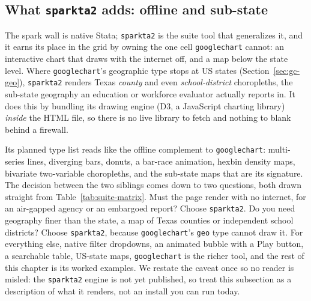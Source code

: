 \documentclass[
    a4paper,
    fontsize=10pt,
    twoside=true,
    numbers=noenddot,
]{kaobook}
\begin{document}
\subsection{What \texttt{sparkta2} adds: offline and sub-state}\label{sec:sparkta2}
The spark wall is native Stata; \texttt{sparkta2} is the suite tool that generalizes it, and it earns its place in the grid by owning the one cell \texttt{googlechart} cannot: an interactive chart that draws with the internet off, and a map below the state level. Where \texttt{googlechart}'s geographic type stops at US states (Section~\ref{sec:gc-geo}), \texttt{sparkta2} renders Texas \emph{county} and even \emph{school-district} choropleths, the sub-state geography an education or workforce evaluator actually reports in. It does this by bundling its drawing engine (D3, a JavaScript charting library) \emph{inside} the HTML file, so there is no live library to fetch and nothing to blank behind a firewall.

Its planned type list reads like the offline complement to \texttt{googlechart}: multi-series lines, diverging bars, donuts, a bar-race animation, hexbin density maps, bivariate two-variable choropleths, and the sub-state maps that are its signature. The decision between the two siblings comes down to two questions, both drawn straight from Table~\ref{tab:suite-matrix}. Must the page render with no internet, for an air-gapped agency or an embargoed report? Choose \texttt{sparkta2}. Do you need geography finer than the state, a map of Texas counties or independent school districts? Choose \texttt{sparkta2}, because \texttt{googlechart}'s \texttt{geo} type cannot draw it. For everything else, native filter dropdowns, an animated bubble with a Play button, a searchable table, US-state maps, \texttt{googlechart} is the richer tool, and the rest of this chapter is its worked examples. We restate the caveat once so no reader is misled: the \texttt{sparkta2} engine is not yet published, so treat this subsection as a description of what it renders, not an install you can run today.
\end{document}
